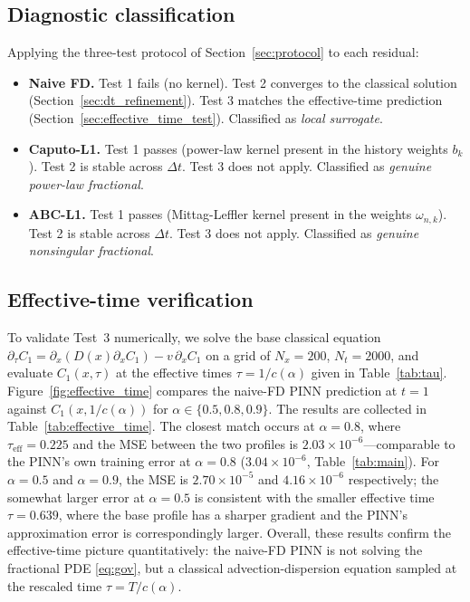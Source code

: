 \documentclass[11pt]{article}
\begin{document}
\subsection{Diagnostic classification}
\label{sec:diagnostic_results}

Applying the three-test protocol of Section~\ref{sec:protocol} to each residual:

\begin{itemize}
\item \textbf{Naive FD.} Test 1 fails (no kernel). Test 2 converges to the classical solution (Section~\ref{sec:dt_refinement}). Test 3 matches the effective-time prediction (Section~\ref{sec:effective_time_test}). Classified as \emph{local surrogate}.
\item \textbf{Caputo-L1.} Test 1 passes (power-law kernel present in the history weights \(b_k\)). Test 2 is stable across \(\Delta t\). Test 3 does not apply. Classified as \emph{genuine power-law fractional}.
\item \textbf{ABC-L1.} Test 1 passes (Mittag-Leffler kernel present in the weights \(\omega_{n,k}\)). Test 2 is stable across \(\Delta t\). Test 3 does not apply. Classified as \emph{genuine nonsingular fractional}.
\end{itemize}

\subsection{Effective-time verification}
\label{sec:effective_time_verification}

To validate Test~3 numerically, we solve the base classical equation
\(\partial_\tau C_1 = \partial_x(D(x)\partial_x C_1) - v\,\partial_x C_1\)
on a grid of \(N_x=200\), \(N_t=2000\), and evaluate \(C_1(x,\tau)\) at
the effective times \(\tau = 1/c(\alpha)\) given in Table~\ref{tab:tau}.
Figure~\ref{fig:effective_time} compares the naive-FD PINN prediction at
\(t=1\) against \(C_1(x,1/c(\alpha))\) for \(\alpha \in \{0.5, 0.8, 0.9\}\).
The results are collected in Table~\ref{tab:effective_time}. The closest
match occurs at \(\alpha=0.8\), where \(\tau_{\mathrm{eff}}=0.225\) and
the MSE between the two profiles is \(2.03\times 10^{-6}\)---comparable
to the PINN's own training error at \(\alpha=0.8\)
(\(3.04\times 10^{-6}\), Table~\ref{tab:main}). For \(\alpha=0.5\) and
\(\alpha=0.9\), the MSE is \(2.70\times 10^{-5}\) and
\(4.16\times 10^{-6}\) respectively; the somewhat larger error at
\(\alpha=0.5\) is consistent with the smaller effective time
\(\tau=0.639\), where the base profile has a sharper gradient and the
PINN's approximation error is correspondingly larger. Overall, these
results confirm the effective-time picture quantitatively: the naive-FD
PINN is not solving the fractional PDE \eqref{eq:gov}, but a classical
advection-dispersion equation sampled at the rescaled time
\(\tau = T/c(\alpha)\).
\end{document}
